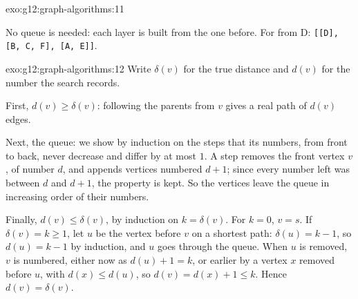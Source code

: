 \begin{solution}{exo:g12:graph-algorithms:11}
\smallskip\noindent\hspace*{2em}

\noindent\hspace*{4em}

\noindent\hspace*{4em}

\noindent\hspace*{6em}

\noindent\hspace*{6em}

\noindent\hspace*{8em}

\noindent\hspace*{10em}

\noindent\hspace*{12em}

\noindent\hspace*{12em}

\noindent\hspace*{6em}

\noindent\hspace*{8em}

\noindent\hspace*{6em}

\smallskip\noindent No queue is needed: each layer is built from the one before. For  from D:
\texttt{[[\textquotesingle{}D\textquotesingle{}], [\textquotesingle{}B\textquotesingle{}, \textquotesingle{}C\textquotesingle{}, \textquotesingle{}F\textquotesingle{}], [\textquotesingle{}A\textquotesingle{}, \textquotesingle{}E\textquotesingle{}]]}.
\end{solution}

\begin{solution}{exo:g12:graph-algorithms:12}
Write $\delta(v)$ for the true distance and $d(v)$ for the number the search records.

First, $d(v) \ge \delta(v)$: following the parents from $v$ gives a real path of $d(v)$ edges.

Next, the queue: we show by induction on the steps that its numbers, from front to back, never decrease and differ by
at most $1$. A step removes the front vertex $v$, of number $d$, and appends vertices numbered $d + 1$; since every
number left was between $d$ and $d + 1$, the property is kept. So the vertices leave the queue in increasing order
of their numbers.

Finally, $d(v) \le \delta(v)$, by induction on $k = \delta(v)$. For $k = 0$, $v = s$. If $\delta(v) = k \ge 1$, let
$u$ be the vertex before $v$ on a shortest path: $\delta(u) = k - 1$, so $d(u) = k - 1$ by induction, and $u$ goes
through the queue. When $u$ is removed, $v$ is numbered, either now as $d(u) + 1 = k$, or earlier by a vertex $x$
removed before $u$, with $d(x) \le d(u)$, so $d(v) = d(x) + 1 \le k$. Hence $d(v) = \delta(v)$.
\end{solution}

